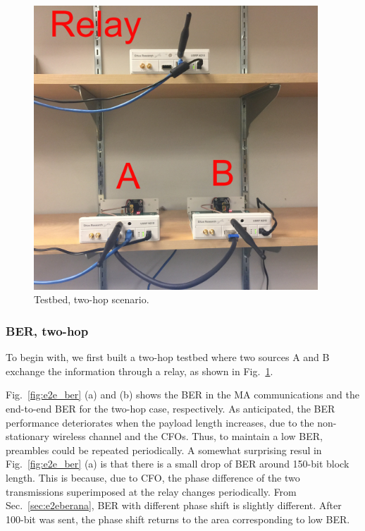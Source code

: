 \begin{figure}
    \centering
    \includegraphics[width=0.95\textwidth]{figures/testbed}
    \caption{Testbed, two-hop scenario.}\label{fig:twohoptestbed}
\end{figure}

\subsubsection{BER, two-hop}
To begin with, we first built a two-hop testbed where two sources A and B exchange the information through a relay, as shown in Fig.~\ref{fig:twohoptestbed}. 

Fig.~\ref{fig:e2e_ber} (a) and (b) shows the BER in the MA communications and the end-to-end BER for the two-hop case, respectively. As anticipated, the BER performance deteriorates when the payload length increases, due to the non-stationary wireless channel and the CFOs. Thus, to maintain a low BER,  preambles could be repeated periodically.
A somewhat surprising resul in Fig.~\ref{fig:e2e_ber} (a) is that there is a small drop of BER around 150-bit block length. This is because, due to CFO, the phase difference of the two transmissions superimposed at the relay changes periodically. From  Sec.~\ref{sec:e2eberana}, BER with different phase shift is slightly different. After 100-bit was sent, the phase shift returns to the area corresponding to low BER.  %

